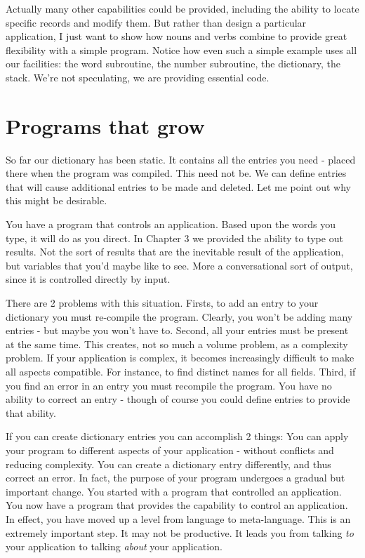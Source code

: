 \documentclass[b5paper, oneside]{book}
\begin{document}
Actually many other capabilities could be provided, including the ability to locate specific records and modify them. But rather than design a particular application, I just want to show how nouns and verbs combine to provide great flexibility with a simple program. Notice how even such a simple example uses all our facilities: the word subroutine, the number subroutine, the dictionary, the stack. We're not speculating, we are providing essential code.



\chapter{Programs that grow}
So far our dictionary has been static. It contains all the entries you need - placed there when the program was compiled. This need not be. We can define entries that will cause additional entries to be made and deleted. Let me point out why this might be desirable.

You have a program that controls an application. Based upon the words you type, it will do as you direct. In Chapter 3 we provided the ability to type out results. Not the sort of results that are the inevitable result of the application, but variables that you'd maybe like to see. More a conversational sort of output, since it is controlled directly by input.

There are 2 problems with this situation. Firsts, to add an entry to your dictionary you must re-compile the program. Clearly, you won't be adding many entries - but maybe you won't have to. Second, all your entries must be present at the same time. This creates, not so much a volume problem, as a complexity problem. If your application is complex, it becomes increasingly difficult to make all aspects compatible. For instance, to find distinct names for all fields. Third, if you find an error in an entry you must recompile the program. You have no ability to correct an entry - though of course you could define entries to provide that ability.

If you can create dictionary entries you can accomplish 2 things: You can apply your program to different aspects of your application - without conflicts and reducing complexity. You can create a dictionary entry differently, and thus correct an error. In fact, the purpose of your program undergoes a gradual but important change. You started with a program that controlled an application. You now have a program that provides the capability to control an application. In effect, you have moved up a level from language to meta-language. This is an extremely important step. It may not be productive. It leads you from talking {\em to} your application to talking {\em about} your application.
\end{document}
